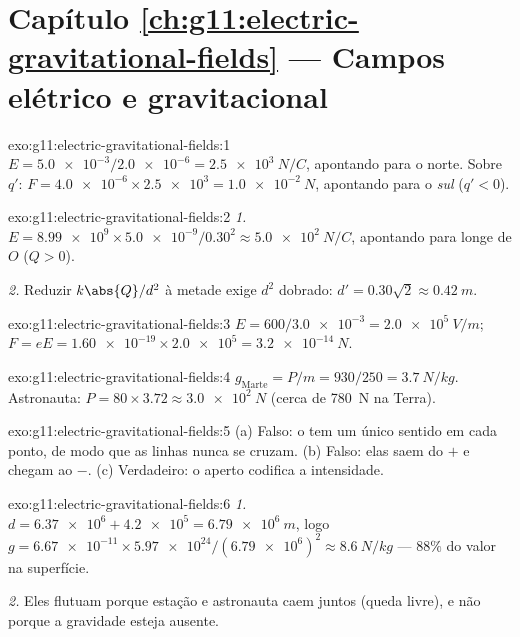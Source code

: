 \section*{Capítulo \ref{ch:g11:electric-gravitational-fields} --- Campos elétrico e gravitacional}

\begin{solution}{exo:g11:electric-gravitational-fields:1}
$E = \num{5.0e-3} / \num{2.0e-6} = \qty{2.5e3}{N/C}$, apontando para o
norte. Sobre $q'$:
$F = \num{4.0e-6} \times \num{2.5e3} = \qty{1.0e-2}{N}$, apontando para
o \emph{sul} ($q' < 0$).
\end{solution}

\begin{solution}{exo:g11:electric-gravitational-fields:2}
\emph{1.} $E = \num{8.99e9} \times \num{5.0e-9} / 0.30^2
\approx \qty{5.0e2}{N/C}$, apontando para longe de $O$ ($Q > 0$).

\emph{2.} Reduzir $k\abs{Q}/d^2$ à metade exige $d^2$ dobrado:
$d' = 0.30\sqrt{2} \approx \qty{0.42}{m}$.
\end{solution}

\begin{solution}{exo:g11:electric-gravitational-fields:3}
$E = 600 / \num{3.0e-3} = \qty{2.0e5}{V/m}$;
$F = eE = \num{1.60e-19} \times \num{2.0e5} = \qty{3.2e-14}{N}$.
\end{solution}

\begin{solution}{exo:g11:electric-gravitational-fields:4}
$g_{\text{Marte}} = P/m = 930/250 = \qty{3.7}{N/kg}$. Astronauta:
$P = 80 \times 3.72 \approx \qty{3.0e2}{N}$ (cerca de \qty{780}{N} na
Terra).
\end{solution}

\begin{solution}{exo:g11:electric-gravitational-fields:5}
(a) Falso: o  tem um único sentido em cada ponto, de modo que as
linhas nunca se cruzam. (b) Falso: elas saem do $+$ e chegam ao $-$.
(c) Verdadeiro: o aperto codifica a intensidade.
\end{solution}

\begin{solution}{exo:g11:electric-gravitational-fields:6}
\emph{1.} $d = \num{6.37e6} + \num{4.2e5} = \qty{6.79e6}{m}$, logo
$g = \num{6.67e-11} \times \num{5.97e24} / (\num{6.79e6})^2
\approx \qty{8.6}{N/kg}$ --- $88\%$ do valor na superfície.

\emph{2.} Eles flutuam porque estação e astronauta caem juntos (queda
livre), e não porque a gravidade esteja ausente.
\end{solution}

